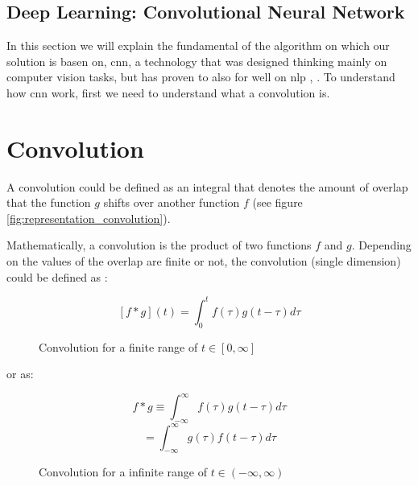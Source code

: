 \cite{ensemble2009Polikar}

\fi

\subsection{Deep Learning: Convolutional Neural Network}
\label{subsec:deep_learning}

In this section we will explain the fundamental of the algorithm on which our solution is basen on, \acrlong{cnn}, a technology that was designed thinking mainly on computer vision tasks, but has proven to also for well on \acrshort{nlp} \cite{zhang2015sensitivity}, \cite{kim2014convolutional}. To understand how \acrshort{cnn} work, first we need to understand what a convolution is.

\section{Convolution}

A convolution could be defined as an integral that denotes the amount of overlap that the function $g$ shifts over another function $f$ (see figure \ref{fig:representation_convolution}).

Mathematically, a convolution is the product of two functions $f$ and $g$. Depending on the values of the overlap are finite or not, the convolution (single dimension) could be defined as \cite{convolution}: 

\begin{figure}[!htp]
  \center
  \[[f \ast g](t)=\int_{0}^{t} f(\tau)g(t-\tau)d\tau\]
  \caption{Convolution for a finite range of $t \in [0, \infty]$}
  \label{fig:convolution_finite_range}
\end{figure}

or as:

\begin{figure}[!htp]
  \center
  \[f \ast g \equiv \int_{-\infty}^{\infty} f(\tau)g(t-\tau)d\tau\]\[=\int_{-\infty}^{\infty} g(\tau)f(t-\tau)d\tau\]
  \caption{Convolution for a infinite range of $t \in (-\infty, \infty)$}
  \label{fig:convolution_infinite_range}
\end{figure}

